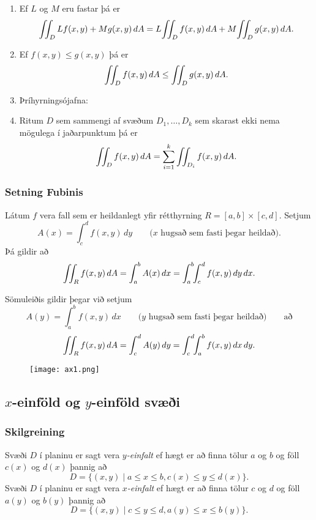 \begin {enumerate}
 \item  Ef $L$ og $M$ eru fastar þá er
$$\tvint_D Lf(x,y)+Mg(x,y)\,dA=L\!\tvint_D f(x,y)\,dA+M\!\tvint_D
g(x,y)\,dA.$$
\item  Ef $f(x,y)\leq g(x,y)$ þá er 
$$\int\!\!\!\int_D f(x,y)\,dA\leq \int\!\!\!\int_Dg(x,y)\,dA.$$

\item  Þríhyrningsójafna: 
\scalebox{1}{$\qquad\bigg|\tvint_D f(x,y)\,dA\bigg|\leq \tvint_D |f(x,y)|\,dA.$}

\item  Ritum $D$ sem sammengi af svæðum $D_1,\ldots, D_k$ sem skarast
ekki nema mögulega í jaðarpunktum þá er
$$\int\!\!\!\int_D f(x,y)\,dA=\sum_{i=1}^k\int\!\!\!\int_{D_i}f(x,y)\,dA.$$
\end {enumerate}




\subsubsection{Setning Fubinis }

Látum $f$ vera fall sem er heildanlegt yfir rétthyrning $R=[a,b]\times
[c,d]$. Setjum
\[A(x)=\int_c^d f(x,y)\,dy\qquad\mbox{($x$ hugsað sem fasti þegar heildað)}.\]
Þá gildir að 
\[\int\!\!\!\int_R f(x,y)\,dA=\int_a^b A(x)\,dx=\int_a^b\!\!\int_c^d
f(x,y)\,dy\,dx.\]

Sömuleiðis gildir þegar við setjum 
\[A(y)=\int_a^b f(x,y)\,dx\qquad\mbox{($y$ hugsað sem fasti þegar heildað)} \qquad \text{að}\]
\[\int\!\!\!\int_R f(x,y)\,dA=\int_c^d A(y)\,dy=\int_c^d\!\!\int_a^b
f(x,y)\,dx\,dy.\]



    \begin {figure}[h!]
 \centering
            \texttt{[image: ax1.png]}
            \caption*{}
\end {figure}



\subsection{$x$-einföld og $y$-einföld svæði} 

\subsubsection{Skilgreining }
Svæði $D$ í planinu er sagt vera $y${\em-einfalt}  ef hægt er að finna tölur $a$ og $b$ og föll $c(x)$ og
$d(x)$ þannig að  
$$D=\{(x,y)\mid a\leq x\leq b, c(x)\leq y\leq d(x)\}.$$
Svæði $D$ í planinu er sagt vera $x${\em-einfalt}  ef hægt er að
finna tölur $c$ og $d$ og föll $a(y)$ og $b(y)$ þannig að  
$$D=\{(x,y)\mid c\leq y\leq d, a(y)\leq x\leq b(y)\}.$$

